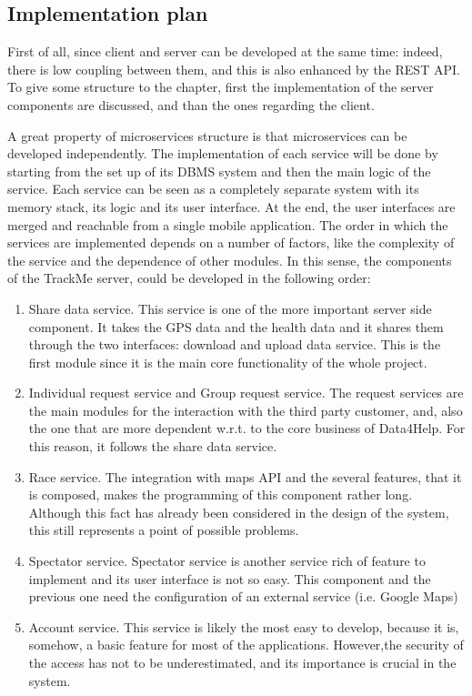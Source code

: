 \subsection{Implementation plan}
First of all, since client and server can be developed at the same time: indeed, there is low coupling
between them, and this is also enhanced by the REST API. To give some structure to the chapter, first the
implementation of the server components are discussed, and than the ones regarding the client. \\ 
 \par 
A great property of microservices structure is that microservices can be developed independently. 
The implementation of each service will be done by starting from the set up of its DBMS system and then
the main logic of the service. 
Each service can be seen as a completely separate system with its memory stack, its logic and its user
interface. 
At the end, the user interfaces are merged and reachable from a single mobile application. 
The order in which the services are implemented depends on a number of factors, like the complexity of the
service and the dependence of other modules. 
In this sense, the components of the TrackMe server, could be developed in the following order:
 \begin{enumerate}
\item Share data service.
This service is one of the more important server side component. It takes the GPS data and the health data
and it shares them through the two interfaces: download and upload data service. 
This is the first module since it is the main core functionality of the whole project. 
\item Individual request service and Group request service.
The request services are the main modules for the interaction with the third party customer, and, also
the one that are more dependent w.r.t. to the core business of Data4Help. For this reason, it follows 
the share data service.
\item Race service.
The integration with maps API and the several features, that it is composed, makes the programming of this
component rather long. Although this fact has already been considered in the design of the system, this
still represents a point of possible problems.
\item Spectator service.
Spectator service is another service rich of feature to implement and its user interface is not so easy.  
This component and the previous one need the configuration of an external service (i.e. Google Maps) 
\item Account service. 
This service is likely the most easy to develop, because it is, somehow, a basic feature for most of the
applications. 
However,the security of the access has not to be underestimated, and its importance is crucial in the
system.
\end{enumerate}   
